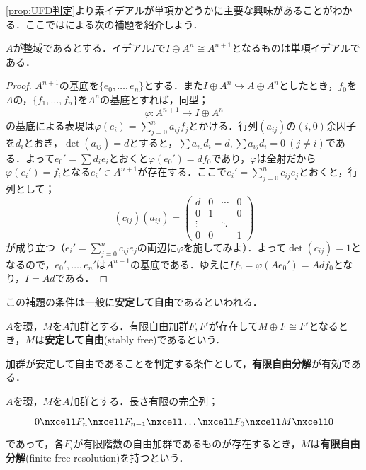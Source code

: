 \ref{prop:UFD判定}より素イデアルが単項かどうかに主要な興味があることがわかる．ここでは\cite{narita}による次の補題を紹介しよう．

\begin{lem}\label{lem:安定して自由でrank1なら単項}
	$A$が整域であるとする．イデアル$I$で$I\oplus A^n\cong A^{n+1}$となるものは単項イデアルである．
\end{lem}

\begin{proof}
	$A^{n+1}$の基底を$\{e_0,\dots,e_n\}$とする．また$I\oplus A^n\hookrightarrow A\oplus A^{n}$としたとき，$f_0$を$A$の，$\{f_1,\dots,f_n\}$を$A^n$の基底とすれば，同型；
	\[\varphi:A^{n+1}\to I\oplus A^n\]
	の基底による表現は$\varphi(e_i)=\sum_{j=0}^n a_{ij}f_j$とかける．行列$(a_{ij})$の$(i,0)$余因子を$d_i$とおき，$\det (a_{ij})=d$とすると，$\sum a_{i0}d_i=d,\sum a_{ij}d_i=0~(j\neq i)$である．よって$e_0'=\sum d_ie_i$とおくと$\varphi(e_0')=df_0$であり，$\varphi$は全射だから$\varphi(e_i')=f_i$となる$e_i'\in A^{n+1}$が存在する．ここで$e_i'=\sum_{j=0}^n c_{ij}e_j$とおくと，行列として；
	\[(c_{ij})(a_{ij})=
		\begin{pmatrix}
			d&0&\cdots&0\\
			0&1&&0\\
			\vdots&&\ddots\\
			0&0&&1
	\end{pmatrix}\]
	が成り立つ（$e_i'=\sum_{j=0}^n c_{ij}e_j$の両辺に$\varphi$を施してみよ）．よって$\det (c_{ij})=1$となるので，$e_0',\dots,e_n'$は$A^{n+1}$の基底である．ゆえに$If_0=\varphi(Ae_0')=Ad f_0$となり，$I=Ad$である．
\end{proof}
この補題の条件は一般に\textbf{安定して自由}であるといわれる．

\begin{defi}[安定して自由]
	$A$を環，$M$を$A$加群とする．有限自由加群$F,F'$が存在して$M\oplus F\cong F'$となるとき，$M$は\textbf{安定して自由}(stably free)であるという．
\end{defi}

加群が安定して自由であることを判定する条件として，\textbf{有限自由分解}が有効である．
\begin{defi}[有限自由分解]
	$A$を環，$M$を$A$加群とする．長さ有限の完全列；
	\[\begin{tikzcd}
		0\nxcell F_n\nxcell F_{n-1}\nxcell\dots\nxcell F_0\nxcell M\nxcell 0
	\end{tikzcd}\]
	であって，各$F_i$が有限階数の自由加群であるものが存在するとき，$M$は\textbf{有限自由分解}(finite free resolution)を持つという．
\end{defi}

